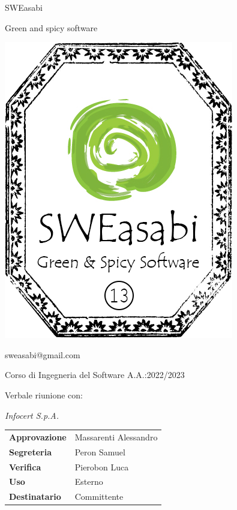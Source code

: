 \documentclass{article}
\begin{document}
\begin{center}
\begin{center}
\begin{minipage}{0.49\linewidth}
\begin{flushright}
\begin{minipage}{0.5\linewidth}
\begin{center}
            \Large SWEasabi
    
            \tiny Green and spicy software
    
            \includegraphics[width=0.67\linewidth]{../../../../assets_globali/img/logo_13.png}
            
            \small sweasabi@gmail.com
    
            \end{center}
            \end{minipage}
            \end{flushright}
        \end{minipage}
    \end{center}

    \vspace{2cm}

    \normalsize Corso di Ingegneria del Software A.A.:2022/2023
    
    \Huge Verbale riunione con:
    
    \textit{Infocert S.p.A.}
        
    \vspace{2cm}
    
    \normalsize
    \begin{center}
        \begin{tabularx}{7cm}{l | X}            
            \textbf{Approvazione} & Massarenti Alessandro\\
            \textbf{Segreteria} & Peron Samuel\\
            \textbf{Verifica} & Pierobon Luca\\
            \hline
            \textbf{Uso} & Esterno\\
            \textbf{Destinatario} & Committente\\
        \end{tabularx}
    \end{center}
        
\end{center}
\end{document}
